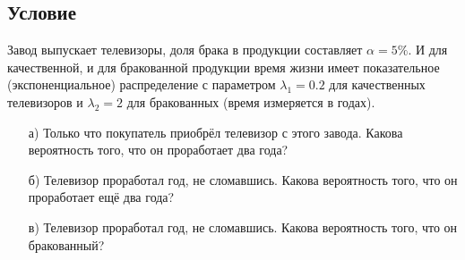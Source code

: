\documentclass{article}
\begin{document}
\subsection*{Условие}
Завод выпускает телевизоры, доля брака в продукции составляет $ \alpha \! = \! 5\% $. И для качественной, и для бракованной продукции время жизни имеет показательное (экспоненциальное) распределение с параметром $ \lambda_1 \! = \! 0.2 $ для качественных телевизоров и $ \lambda_2 \! = \! 2 $ для бракованных (время измеряется в годах).
\begin{enumerate}
\item[а)] Только что покупатель приобрёл телевизор с этого завода. Какова вероятность того, что он проработает два года?
\item[б)] Телевизор проработал год, не сломавшись. Какова вероятность того, что он проработает ещё два года?
\item[в)] Телевизор проработал год, не сломавшись. Какова вероятность того, что он бракованный?
\end{enumerate}
\end{document}
